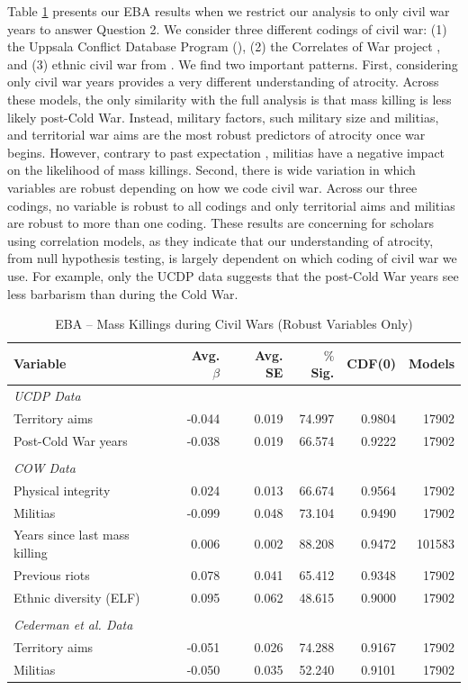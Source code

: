 \documentclass[a4paper,12pt]{article}
\begin{document}
Table \ref{tab:ucdp} presents our EBA results when we restrict our analysis to only civil war years to answer Question 2. We consider three different codings of civil war: (1) the Uppsala Conflict Database Program  (\citeyear{allansson2017organized,gleditsch2002armed}), (2) the Correlates of War project \citep{sarkees2010resort}, and (3) ethnic civil war from \citet{cederman2010ethnic}. We find two important patterns. First, considering only civil war years provides a very different understanding of atrocity. Across these models, the only similarity with the full analysis is that mass killing is less likely post-Cold War. Instead, military factors, such military size and militias, and territorial war aims are the most robust predictors of atrocity once war begins. However, contrary to past expectation \citep{koren2017means}, militias have a negative impact on the likelihood of mass killings. Second, there is wide variation in which variables are robust depending on how we code civil war. Across our three codings, no variable is robust to all codings and only territorial aims and militias are robust to more than one coding. These results are concerning for scholars using correlation models, as they indicate that our understanding of atrocity, from null hypothesis testing, is largely dependent on which coding of civil war we use. For example, only the UCDP data suggests that the post-Cold War years see less barbarism than during the Cold War.

\newpage

\begin{table}[H]
\centering
\begin{tabular}{lrrrrr}
\hline
\textbf{Variable} & \textbf{Avg. $\beta$} & \textbf{Avg. SE} & \textbf{$\%$ Sig.} & \textbf{CDF(0)} & \textbf{Models} \\ \hline
\textit{UCDP Data} &  &  &  &  &  \\
Territory aims & -0.044 & 0.019 & 74.997 & 0.9804 & 17902 \\
Post-Cold War years & -0.038 & 0.019 & 66.574 & 0.9222 & 17902 \\
 &  &  &  &  &  \\
\textit{COW Data} &  &  &  &  &  \\
Physical integrity & 0.024 & 0.013 & 66.674 & 0.9564 & 17902 \\
Militias & -0.099 & 0.048 & 73.104 & 0.9490 & 17902 \\
Years since last mass killing & 0.006 & 0.002 & 88.208 & 0.9472 & 101583 \\
Previous riots & 0.078 & 0.041 & 65.412 & 0.9348 & 17902 \\
Ethnic diversity (ELF) & 0.095 & 0.062 & 48.615 & 0.9000 & 17902 \\
& & & & \\
\textit{Cederman et al. Data} &  &  &  &  &  \\
Territory aims & -0.051 & 0.026 & 74.288 & 0.9167 & 17902 \\
Militias & -0.050 & 0.035 & 52.240 & 0.9101 & 17902 \\ \hline
\end{tabular}
\caption{EBA -- Mass Killings during Civil Wars (Robust Variables Only)}
\label{tab:ucdp}
\end{table}
	
\end{document}

